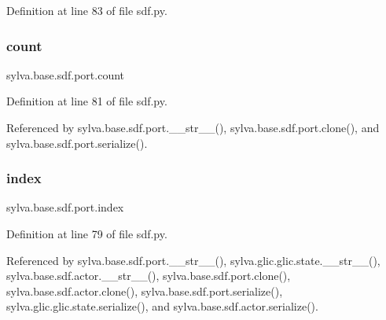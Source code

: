 Definition at line 83 of file sdf.\+py.

\mbox{\label{classsylva_1_1base_1_1sdf_1_1port_a628b66dd64830393bcf8d88b85023016}} 
\subsubsection{\texorpdfstring{count}{count}}
{\footnotesize\ttfamily sylva.\+base.\+sdf.\+port.\+count}



Definition at line 81 of file sdf.\+py.



Referenced by sylva.\+base.\+sdf.\+port.\+\_\+\+\_\+str\+\_\+\+\_\+(), sylva.\+base.\+sdf.\+port.\+clone(), and sylva.\+base.\+sdf.\+port.\+serialize().

\mbox{\label{classsylva_1_1base_1_1sdf_1_1port_a4ed6db96ef0a6fb3d9b8f36c59bf7bdd}} 
\subsubsection{\texorpdfstring{index}{index}}
{\footnotesize\ttfamily sylva.\+base.\+sdf.\+port.\+index}



Definition at line 79 of file sdf.\+py.



Referenced by sylva.\+base.\+sdf.\+port.\+\_\+\+\_\+str\+\_\+\+\_\+(), sylva.\+glic.\+glic.\+state.\+\_\+\+\_\+str\+\_\+\+\_\+(), sylva.\+base.\+sdf.\+actor.\+\_\+\+\_\+str\+\_\+\+\_\+(), sylva.\+base.\+sdf.\+port.\+clone(), sylva.\+base.\+sdf.\+actor.\+clone(), sylva.\+base.\+sdf.\+port.\+serialize(), sylva.\+glic.\+glic.\+state.\+serialize(), and sylva.\+base.\+sdf.\+actor.\+serialize().

\mbox{\label{classsylva_1_1base_1_1sdf_1_1port_ace0eb23bb9f3e4a75e6a94f0961a6f99}} 
